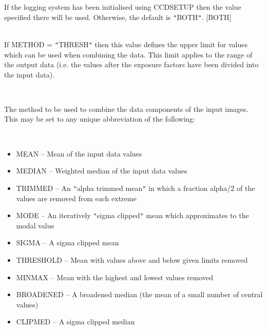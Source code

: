 \documentclass[twoside,11pt]{article}
\newcommand{\htmlref}[2]{#1}
\renewcommand{\_}{\texttt{\symbol{95}}}
\newcommand{\qt}[1]{{\tt "}#1{\tt "}}
\newcommand{\xroutine}[1]{\htmlref{{\sc #1}}{#1}}
\newcommand{\sstsubsection}[1]{ \item[{#1}] \mbox{} \\}
\newcommand{\sstitemlist}[1]{
  \mbox{} \\
  \vspace{-3.5ex}
  \begin{itemize}
     #1
  \end{itemize}
}
\newcommand{\sstitem}{\item}
\newcommand{\sstsubsection}[1]{\item[{#1}]}
\newcommand{\sstitemlist}[1]{
      \begin{itemize}
         #1
      \end{itemize}
      \\
   }
\newcommand{\sstitem}{\item}
\begin{document}
{{{{         }
         If the logging system has been initialised using \xroutine{CCDSETUP}
         then the value specified there will be used. Otherwise, the
         default is \qt{BOTH}.
         [BOTH]
      }
      \sstsubsection{
         MAX = \_REAL (Read)
      } {
         If METHOD = \qt{THRESH} then this value defines the upper limit
         for values which can be used when combining the data. This
         limit applies to the range of the output data (i.e. the values
         after the exposure factors have been divided into the input
         data).
      }
      \sstsubsection{
         METHOD = LITERAL (Read)
      } {
         The method to be used to combine the data components of
         the input images. This may be set to any unique abbreviation of
         the following:
         \sstitemlist{

            \sstitem
               MEAN      -- Mean of the input data values

            \sstitem
               MEDIAN    -- Weighted median of the input data values

            \sstitem
               TRIMMED   -- An \qt{alpha trimmed mean} in which a fraction
                               alpha/2 of the values are removed from
                               each extreme

            \sstitem
               MODE      -- An iteratively \qt{sigma clipped} mean which
                               approximates to the modal value

            \sstitem
               SIGMA     -- A sigma clipped mean

            \sstitem
               THRESHOLD -- Mean with values above and below given
                               limits removed

            \sstitem
               MINMAX    -- Mean with the highest and lowest values
                               removed

            \sstitem
               BROADENED -- A broadened median (the mean of a small
                               number of central values)

            \sstitem
               CLIPMED   -- A sigma clipped median

}}}}
\end{document}
